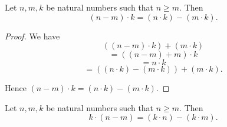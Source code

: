 \documentclass[../arithmetic.tex]{subfiles}
\begin{document}
  \begin{forthel}
    \begin{proposition}
      Let $n, m, k$ be natural numbers such that $n \geq m$.
      Then \[ (n \minus m) \cdot k = (n \cdot k) \minus (m \cdot k). \]
    \end{proposition}
    \begin{proof}
      We have
      \[  ((n \minus m) \cdot k) \plus (m \cdot k)                 \]
      \[    = ((n \minus m) \plus m) \cdot k                       \]
      \[    = n \cdot k                                   \]
      \[    = ((n \cdot k) \minus (m \cdot k)) \plus (m \cdot k).  \]

      Hence $(n \minus m) \cdot k = (n \cdot k) \minus (m \cdot k)$.
    \end{proof}
  \end{forthel}

  \begin{forthel}
    \begin{corollary}
      Let $n, m, k$ be natural numbers such that $n \geq m$.
      Then \[ k \cdot (n \minus m) = (k \cdot n) \minus (k \cdot m). \]
    \end{corollary}
  \end{forthel}
\end{document}
